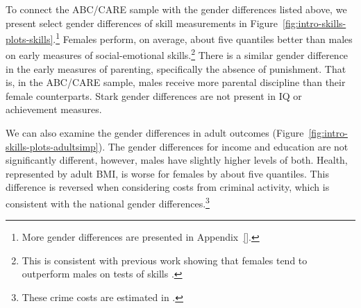 To connect the ABC/CARE sample with the gender differences listed above, we present select gender differences of skill measurements in Figure~\ref{fig:intro-skills-plots-skills}.\footnote{More gender differences are presented in Appendix~\ref{}.} Females perform, on average, about five quantiles better than males on early measures of social-emotional skills.\footnote{This is consistent with previous work showing that females tend to outperform males on tests of skills \citep{Baker-Milligan_2013_Boy-Girl-Differences}.} There is a similar gender difference in the early measures of parenting, specifically the absence of punishment. That is, in the ABC/CARE sample, males receive more parental discipline than their female counterparts. Stark gender differences are not present in IQ or achievement measures. 

We can also examine the gender differences in adult outcomes (Figure~\ref{fig:intro-skills-plots-adultsimp}). The gender differences for income and education are not significantly different, however, males have slightly higher levels of both. Health, represented by adult BMI, is worse for females by about five quantiles. This difference is reversed when considering costs from criminal activity, which is consistent with the national gender differences.\footnote{These crime costs are estimated in \citet{Garcia_etal_2016_Comp_CBA_Unpublished}.} 

